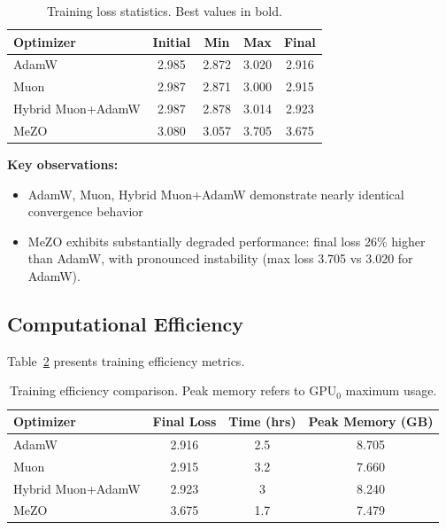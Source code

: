 \documentclass{article}
\begin{document}
\begin{table}[h]
\centering
\begin{tabular}{lcccc}
\toprule
\textbf{Optimizer} & \textbf{Initial} & \textbf{Min} & \textbf{Max} & \textbf{Final} \\
\midrule
AdamW & 2.985 & 2.872 & 3.020 & 2.916 \\
Muon & 2.987 & 2.871 & 3.000 & 2.915 \\
Hybrid Muon+AdamW  & 2.987 & 2.878 & 3.014 & 2.923 \\
MeZO  & 3.080 & 3.057 & 3.705 & 3.675 \\
\bottomrule
\end{tabular}
\caption{Training loss statistics. Best values in bold.}
\label{tab:loss_stats}
\end{table}

\textbf{Key observations:}
\begin{itemize}
    \item AdamW, Muon, Hybrid Muon+AdamW demonstrate nearly identical convergence behavior
    \item MeZO exhibits substantially degraded performance: final loss 26\% higher than AdamW, with pronounced instability (max loss 3.705 vs 3.020 for AdamW).
\end{itemize}

\subsection{Computational Efficiency}

Table~\ref{tab:efficiency} presents training efficiency metrics.

\begin{table}[h]
\centering
\begin{tabular}{lccc}
\toprule
\textbf{Optimizer} & \textbf{Final Loss} & \textbf{Time (hrs)} & \textbf{Peak Memory (GB)} \\
\midrule
AdamW & 2.916 & 2.5 & 8.705 \\
Muon  & 2.915 & 3.2 & 7.660 \\
Hybrid Muon+AdamW  & 2.923 & 3 & 8.240 \\
MeZO  & 3.675 & 1.7 & 7.479 \\
\bottomrule
\end{tabular}
\caption{Training efficiency comparison. Peak memory refers to GPU$_0$ maximum usage.}
\label{tab:efficiency}
\end{table}
\end{document}
